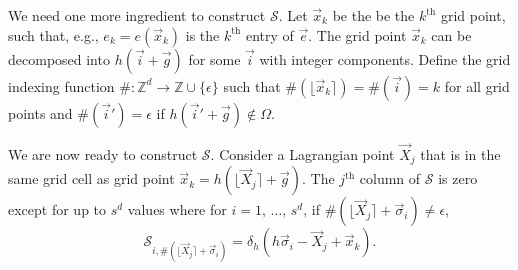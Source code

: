 We need one more ingredient to construct $\mathcal{S}$. Let $\vec{x}_k$ be the
be the $k^\text{th}$ grid point, such that, e.g., $e_k = e(\vec{x}_k)$ is the $k^\text{th}$
entry of $\vec{e}$. The grid point $\vec{x}_k$ can be decomposed into
$h(\vec{i}+\vec{g})$ for some $\vec{i}$ with integer components. Define the
grid indexing function $\#:\mathbb{Z}^d\to\mathbb{Z}\cup\{\epsilon\}$ such that
$\#(\lfloor\vec{x}_k\rceil) = \#(\vec{i}) = k$ for all grid points and
$\#(\vec{i}')=\epsilon$ if $h(\vec{i}'+\vec{g}) \not\in \Omega$.

We are now ready to construct $\mathcal{S}$. Consider a Lagrangian point
$\vec{X}_j$ that is in the same grid cell as grid point
$\vec{x}_k=h(\lfloor\vec{X}_j\rceil+\vec{g})$. The $j^\text{th}$ column of
$\mathcal{S}$ is zero except for up to $s^d$ values where for
$i=1,\,\ldots,\,s^d$, if $\#(\lfloor\vec{X}_j\rceil+\vec{\sigma}_i)\neq\epsilon$,
\begin{equation}
    \label{eq:s-columnwise}
    \mathcal{S}_{i,\#(\lfloor\vec{X}_j\rceil + \vec{\sigma}_i)} = \delta_h(h\vec{\sigma}_i-\vec{X}_j+\vec{x}_k).
\end{equation}
